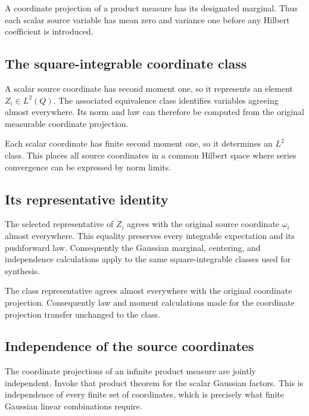 \documentclass[11pt,a4paper]{article}
\begin{document}
A coordinate projection of a product measure has its designated marginal. Thus each scalar source variable has mean zero and variance one before any Hilbert coefficient is introduced.


\subsection{\texorpdfstring{The square-integrable coordinate class}{The square-integrable coordinate class}}


A scalar source coordinate has second moment one, so it represents an element \(Z_i\in L^2(Q)\). The associated equivalence class identifies variables agreeing almost everywhere. Its norm and law can therefore be computed from the original measurable coordinate projection.



Each scalar coordinate has finite second moment one, so it determines an \(L^2\) class. This places all source coordinates in a common Hilbert space where series convergence can be expressed by norm limits.


\subsection{\texorpdfstring{Its representative identity}{Its representative identity}}


The selected representative of \(Z_i\) agrees with the original source coordinate \(\omega_i\) almost everywhere. This equality preserves every integrable expectation and its pushforward law. Consequently the Gaussian marginal, centering, and independence calculations apply to the same square-integrable classes used for synthesis.



The class representative agrees almost everywhere with the original coordinate projection. Consequently law and moment calculations made for the coordinate projection transfer unchanged to the class.


\subsection{\texorpdfstring{Independence of the source coordinates}{Independence of the source coordinates}}


The coordinate projections of an infinite product measure are jointly independent. Invoke that product theorem for the scalar Gaussian factors. This is independence of every finite set of coordinates, which is precisely what finite Gaussian linear combinations require.
\end{document}
